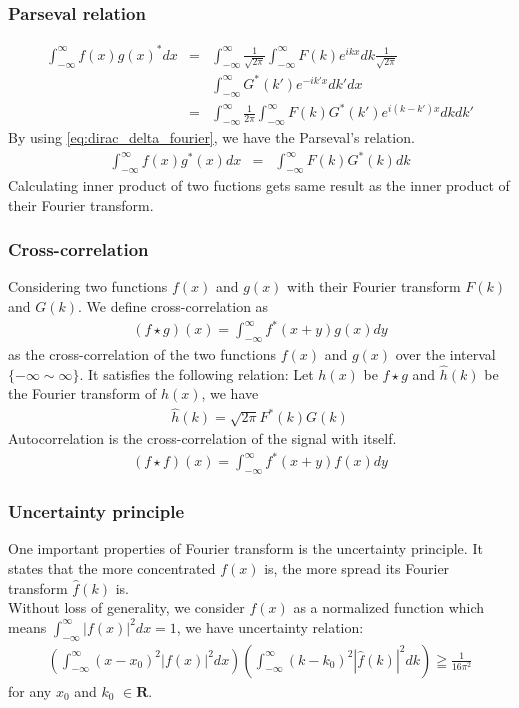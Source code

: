 \documentclass{beamer}
\begin{document}
\begin{frame}
\frametitle{Parseval relation}
\begin{eqnarray}
\int_{-\infty}^{\infty}f(x)g(x)^* dx &=&\int_{-\infty}^{\infty}  \frac{1}{\sqrt{2\pi}} \int_{-\infty}^{\infty} F(k) e^{ikx}dk \frac{1}{\sqrt{2\pi}} \nonumber \\
&&\int_{-\infty}^{\infty}G^*(k') e^{-ik'x}dk' dx\nonumber \\
&=&\int_{-\infty}^{\infty} \frac{1}{2\pi} \int_{-\infty}^{\infty} F(k)G^*(k')e^{i(k-k')x} dk dk' \nonumber
\end{eqnarray}
By using \ref{eq:dirac_delta_fourier}, we have the Parseval's relation.
\begin{eqnarray}
\int_{-\infty}^{\infty}f(x)g^*(x) dx &=& \int_{-\infty}^{\infty}F(k)G^*(k)dk
\label{eq:parseval_relation}
\end{eqnarray}
Calculating inner product of two fuctions gets same result as the inner product of their Fourier transform.
\end{frame}
\begin{frame}
\frametitle{Cross-correlation}
Considering two functions $f(x)$ and $g(x)$ with their Fourier transform $F(k)$ and $G(k)$. We define cross-correlation as
\begin{eqnarray}
(f\star g)(x) = \int_{-\infty}^{\infty}f^*(x+y)g(x)dy
\label{eq:cross_correlation}
\end{eqnarray}
as the cross-correlation of the two functions $f(x)$ and $g(x)$ over the interval $\{ -\infty \sim \infty \}$. It satisfies the following relation:
Let $h(x)$ be $f \star g$ and $\hat{h}(k)$ be the Fourier transform of $h(x)$, we have
\begin{eqnarray}
\hat{h}(k) = \sqrt{2\pi}F^*(k)G(k)
\label{eq:cross_correlation_FT}
\end{eqnarray}
Autocorrelation is the cross-correlation of the signal with itself.
\begin{eqnarray}
(f\star f)(x) = \int_{-\infty}^{\infty}f^*(x+y)f(x)dy
\label{eq:autocorrelation}
\end{eqnarray}
\end{frame}
\begin{frame}
\frametitle{Uncertainty principle}
One important properties of Fourier transform is the uncertainty principle. It states that the more concentrated $f(x)$ is, the more spread its Fourier transform $\hat{f}(k)$ is.\\
Without loss of generality, we consider $f(x)$ as a normalized function which means $\int_{-\infty}^{\infty}|f(x)|^2 dx = 1$, we have uncertainty relation:
\begin{eqnarray}
\left( \int_{-\infty}^{\infty}(x-x_0)^2|f(x)|^2 dx\right) \left( \int_{-\infty}^{\infty}(k-k_0)^2|\hat{f}(k)|^2 dk\right) \geqq \frac{1}{16\pi^2}
\label{eq:uncertainty_wiki}
\end{eqnarray}
for any $x_0$ and $k_0$ $\in \mathbf{R}$.~\cite{wiki_FT}
\end{frame}
\end{document}
